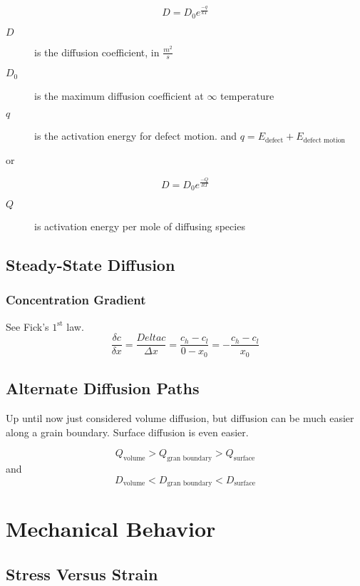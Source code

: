 \documentclass[10pt,letterpaper]{article}
\begin{document}
	\begin{large}
		$$
		D = D_0 e^{\frac{-q}{kT}}
		$$
	\end{large}
	
	\begin{description}
		\item[$D$] is the diffusion coefficient, in $\frac{m^2}{s}$
		\item[$D_0$] is the maximum diffusion coefficient at $\infty$ temperature
		\item[$q$] is the activation energy for defect motion. 
		and $q = E_{\text{defect}} + E_{\text{defect motion}} $
	\end{description} 
	or 
	
	\begin{large}
		$$
		\boxed{D = D_0 e^{\frac{-Q}{RT}}}
		$$
	\end{large}
	\begin{description}
		\item[$Q$] is activation energy per mole of diffusing species
	\end{description}
	\subsection{Steady-State Diffusion}
	\subsubsection*{Concentration Gradient}
	See Fick's $1^{\text{st}}$ law.
	$$
	\frac{\delta c}{\delta x} = \frac{Delta c}{\Delta x} = \frac{c_h - c_l}{0-x_0} = -\frac{c_h-c_l}{x_0}
	$$
	\subsection{Alternate Diffusion Paths}
	Up until now just considered volume diffusion, but diffusion can be much easier along a grain boundary.   Surface diffusion is even easier. 
	
	$$
	Q_{\text{volume}} > Q_{\text{gran boundary}} > Q_{\text{surface}}
	$$
	and
	$$
	D_{\text{volume}} < D_{\text{gran boundary}} < D_{\text{surface}}
	$$
	
	\section{Mechanical Behavior}

	\subsection{Stress Versus Strain}
\end{document}
